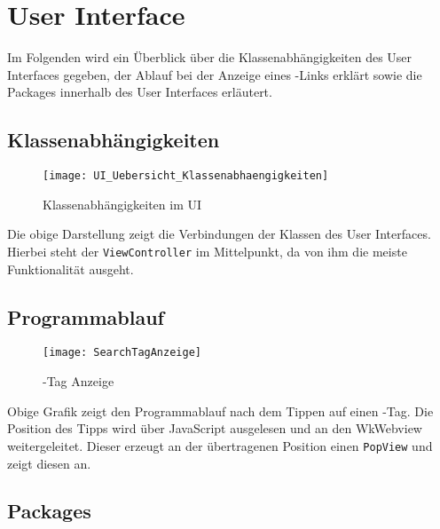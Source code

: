 
\chapter{User Interface}
Im Folgenden wird ein Überblick über die Klassenabhängigkeiten des User Interfaces gegeben, der Ablauf bei der Anzeige eines \SEARCH-Links erklärt sowie die Packages innerhalb des User Interfaces erläutert.

\section{Klassenabhängigkeiten}

\begin{figure}[h]
	\centering
	\texttt{[image: UI\_Uebersicht\_Klassenabhaengigkeiten]}
	\caption{Klassenabhängigkeiten im UI}
\end{figure}

Die obige Darstellung zeigt die Verbindungen der Klassen des User Interfaces. Hierbei steht der \lstinline|ViewController| im Mittelpunkt, da von ihm die meiste Funktionalität ausgeht.
\pagebreak

\section{Programmablauf}

\begin{figure}[ht]
	\centering
	\texttt{[image: SearchTagAnzeige]}
	\caption{\SEARCH-Tag Anzeige}
\end{figure}

Obige Grafik zeigt den Programmablauf nach dem Tippen auf einen \SEARCH-Tag. Die Position des Tipps wird über JavaScript ausgelesen und an den WkWebview weitergeleitet. Dieser erzeugt an der übertragenen Position einen \lstinline|PopView| und zeigt diesen an. 

\section{Packages}







